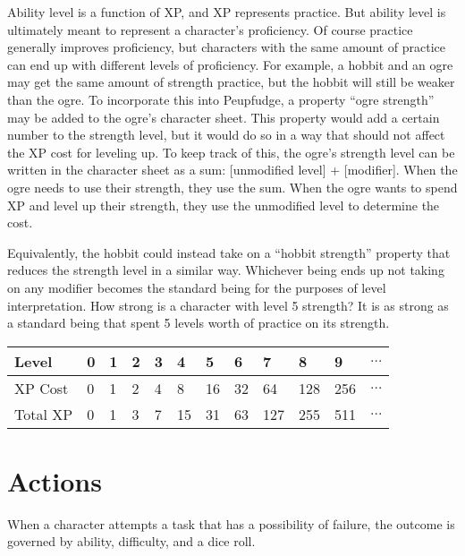 Ability level is a function of XP, and XP represents practice.
But ability level is ultimately meant to represent a character's proficiency.
Of course practice generally improves proficiency, but characters with the same amount of practice can end up with different levels of proficiency.
For example, a hobbit and an ogre may get the same amount of strength practice, but the hobbit will still be weaker than the ogre.
To incorporate this into Peupfudge, a property ``ogre strength'' may be added to the ogre’s character sheet.
This property would add a certain number to the strength level, but it would do so in a way that should not affect the XP cost for leveling up.
To keep track of this, the ogre’s strength level can be written in the character sheet as a sum: [unmodified level] + [modifier].
When the ogre needs to use their strength, they use the sum.
When the ogre wants to spend XP and level up their strength, they use the unmodified level to determine the cost.

Equivalently, the hobbit could instead take on a “hobbit strength” property that reduces the strength level in a similar way.
Whichever being ends up not taking on any modifier becomes the standard being for the purposes of level interpretation.
How strong is a character with level 5 strength?
It is as strong as a standard being that spent 5 levels worth of practice on its strength.

\begin{center}
\begin{tabular}{|l|l|l|l|l|l|l|l|l|l|l|l|}
\hline
Level    & 0 & 1 & 2 & 3 & 4  & 5  & 6  & 7   & 8   & 9   & $\ldots$ \\ \hline
XP Cost  & 0 & 1 & 2 & 4 & 8  & 16 & 32 & 64  & 128 & 256 & $\ldots$ \\ \hline
Total XP & 0 & 1 & 3 & 7 & 15 & 31 & 63 & 127 & 255 & 511 & $\ldots$ \\ \hline
\end{tabular}
\end{center}


\section{Actions}
When a character attempts a task that has a possibility of failure, the outcome is governed by ability, difficulty, and a dice roll. 

